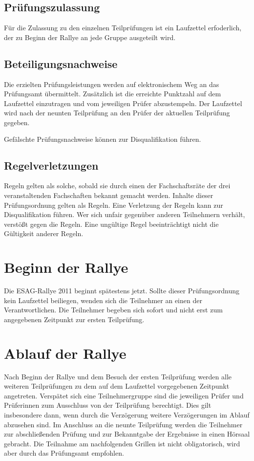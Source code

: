 \documentclass[a4paper,10pt]{article}
\begin{document}
\subsection{Prüfungszulassung}

Für die Zulassung zu den einzelnen Teilprüfungen ist ein Laufzettel erfoderlich, der zu Beginn der Rallye an jede Gruppe ausgeteilt wird.

\subsection{Beteiligungsnachweise}


Die erzielten Prüfungsleistungen werden auf elektronischem Weg an das
Prüfungsamt übermittelt. Zusätzlich ist die erreichte Punktzahl auf dem Laufzettel einzutragen und vom jeweiligen Prüfer abzustempeln. Der Laufzettel wird nach der neunten Teilprüfung an den Prüfer der aktuellen Teilprüfung gegeben.

Gefälschte Prüfungsnachweise können zur Disqualifikation führen.

\subsection{Regelverletzungen}

Regeln gelten als solche, sobald sie durch einen der Fachschaftsräte der
drei veranstaltenden Fachschaften bekannt gemacht werden. Inhalte dieser
Prüfungsordnung gelten als Regeln. Eine Verletzung der Regeln kann zur
Disqualifikation führen. Wer sich unfair gegenüber anderen Teilnehmern
verhält, verstößt gegen die Regeln. Eine ungültige Regel beeinträchtigt
nicht die Gültigkeit anderer Regeln.



\section{Beginn der Rallye}

Die ESAG-Rallye 2011 beginnt spätestens jetzt. Sollte dieser Prüfungsordnung kein Laufzettel beiliegen, wenden sich die Teilnehmer an einen der Verantwortlichen. Die Teilnehmer begeben sich sofort und nicht erst zum angegebenen Zeitpunkt zur ersten Teilprüfung.

\section{Ablauf der Rallye}
Nach Beginn der Rallye und dem Besuch der ersten Teilprüfung werden alle weiteren Teilprüfungen zu dem auf dem Laufzettel vorgegebenen Zeitpunkt angetreten. Verspätet sich eine Teilnehmergruppe sind die jeweiligen Prüfer und Prüferinnen zum Ausschluss von der Teilprüfung berechtigt. Dies gilt insbesondere dann, wenn durch die Verzögerung weitere Verzögerungen im Ablauf abzusehen sind. Im Anschluss an die neunte Teilprüfung werden die Teilnehmer zur abschließenden Prüfung und zur Bekanntgabe der Ergebnisse in einen Hörsaal gebracht. Die Teilnahme am nachfolgenden Grillen ist nicht obligatorisch, wird aber durch das Prüfungsamt empfohlen.
\end{document}
